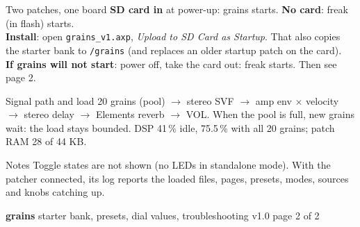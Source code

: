 \documentclass{article}
\begin{document}
\begin{minipage}[t]{57mm}\vspace{0pt}
\begin{card}{Two patches, one board}
\textbf{SD card in} at power-up: grains starts. \textbf{No card}: freak (in flash) starts.\\[0.4mm]
\textbf{Install}: open \texttt{grains\_v1.axp}, \emph{Upload to SD Card as Startup}. That also copies the
starter bank to \texttt{/grains} (and replaces an older startup patch on the card).\\[0.4mm]
\textbf{If grains will not start}: power off, take the card out: freak starts. Then see page 2.
\end{card}
\begin{card}{Signal path and load}
20 grains (pool) \(\to\) stereo SVF \(\to\) amp env \(\times\) velocity \(\to\) stereo delay
\(\to\) Elements reverb \(\to\) VOL. When the pool is full, new grains wait: the load stays bounded.
DSP 41\,\% idle, 75.5\,\% with all 20 grains; patch RAM 28 of 44 KB.
\end{card}
\begin{card}{Notes}
Toggle states are not shown (no LEDs in standalone mode). With the patcher connected, its log reports the
loaded files, pages, presets, modes, sources and knobs catching up.
\end{card}
\end{minipage}

\newpage
{\fontsize{16}{18}\selectfont\bfseries grains}\hspace{3mm}%
{\fontsize{9.5}{11}\selectfont starter bank, presets, dial values, troubleshooting}\hfill
{\fontsize{7}{8}\selectfont\color{black!55} v1.0 \textperiodcentered{} page 2 of 2}
\end{document}
